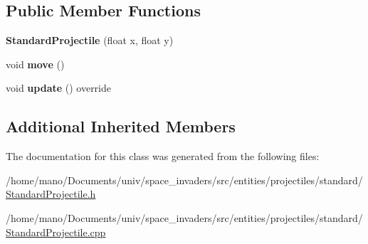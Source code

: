 \subsection*{Public Member Functions}
\begin{DoxyCompactItemize}
\item 
\mbox{\label{classentities_1_1projectiles_1_1standard_1_1StandardProjectile_a36a576f2cbb69f86b100a089591f190c}} 
{\bfseries Standard\+Projectile} (float x, float y)
\item 
\mbox{\label{classentities_1_1projectiles_1_1standard_1_1StandardProjectile_a02b8c02279340f88b3143eb75d4257a8}} 
void {\bfseries move} ()
\item 
\mbox{\label{classentities_1_1projectiles_1_1standard_1_1StandardProjectile_a51122df8dc5e0fb55317e18f45c5f24e}} 
void {\bfseries update} () override
\end{DoxyCompactItemize}
\subsection*{Additional Inherited Members}


The documentation for this class was generated from the following files\+:\begin{DoxyCompactItemize}
\item 
/home/mano/\+Documents/univ/space\+\_\+invaders/src/entities/projectiles/standard/\hyperlink{StandardProjectile_8h}{Standard\+Projectile.\+h}\item 
/home/mano/\+Documents/univ/space\+\_\+invaders/src/entities/projectiles/standard/\hyperlink{StandardProjectile_8cpp}{Standard\+Projectile.\+cpp}\end{DoxyCompactItemize}
